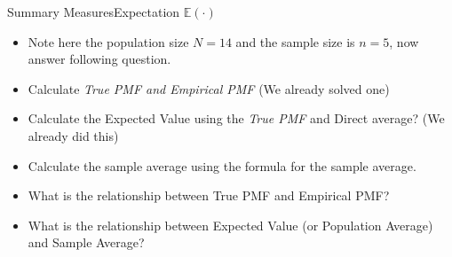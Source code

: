 \documentclass[8pt, usepdftitle = false]{beamer}
\begin{document}
\begin{frame}[allowframebreaks]{Summary Measures}{Expectation $\mathbb{E}(\cdot)$}
\begin{itemize}
\item Note here the population size $N = 14$ and the sample size is $n = 5$, now answer following question.

\item Calculate \emph{True PMF and Empirical PMF} (We already solved one)


\item Calculate the Expected Value using the \emph{True PMF} and Direct average? (We already did this)

\item Calculate the sample average using the formula for the sample average.

\item What is the relationship between True PMF and Empirical PMF? 

\item What is the relationship between Expected Value (or Population Average) and Sample Average? 


\end{itemize}



\end{frame}
\end{document}
